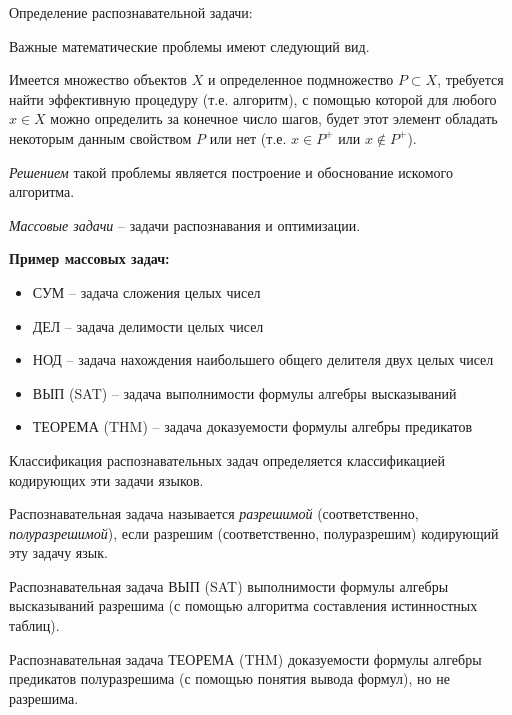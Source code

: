 Определение распознавательной задачи:
\begin{definition}
    Важные математические проблемы имеют следующий вид.

    Имеется множество объектов $X$ и определенное подмножество $P\subset X$, требуется найти эффективную процедуру (т.е. алгоритм), с помощью которой для любого $x \in X$ можно определить за конечное число шагов, будет этот элемент обладать некоторым данным свойством $P$ или нет (т.е. $x\in P^+$ или $x\notin P^+$).

    \textit{Решением} такой проблемы является построение и обоснование искомого алгоритма.
\end{definition}

\textit{Массовые задачи} -- задачи распознавания и оптимизации.

\textbf{Пример массовых задач:}

\begin{itemize}
    \item СУМ -- задача сложения целых чисел
    \item ДЕЛ -- задача делимости целых чисел
    \item НОД -- задача нахождения наибольшего общего делителя двух целых чисел
    \item ВЫП (SAT) -- задача выполнимости формулы алгебры высказываний
    \item ТЕОРЕМА (THM) -- задача доказуемости формулы алгебры предикатов
\end{itemize}

Классификация распознавательных задач определяется классификацией кодирующих эти задачи языков.

\begin{definition}
    Распознавательная задача называется \textit{разрешимой} (соответственно, \textit{полуразрешимой}), если разрешим (соответственно, полуразрешим) кодирующий эту задачу язык.
\end{definition}

\begin{example}
    Распознавательная задача ВЫП (SAT) выполнимости формулы алгебры высказываний разрешима (с помощью алгоритма составления истинностных таблиц).
\end{example}

\begin{example}
    Распознавательная задача ТЕОРЕМА (THM) доказуемости формулы алгебры предикатов полуразрешима (с помощью понятия вывода формул), но не разрешима.
\end{example}
